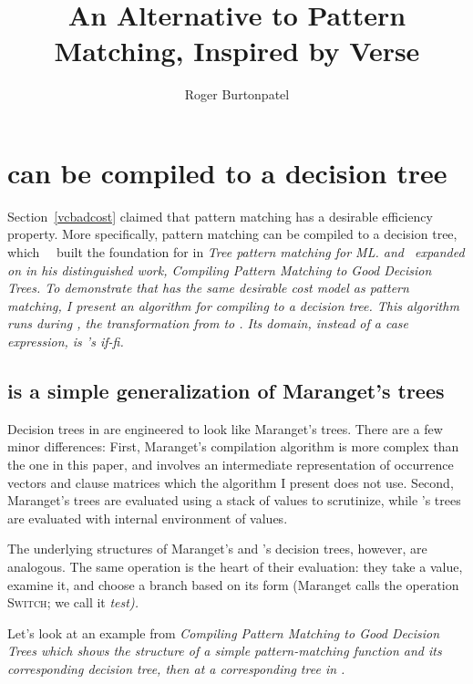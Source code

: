 \documentclass[manuscript,screen,review, 12pt, nonacm]{acmart}
\title{An Alternative to Pattern Matching, Inspired by Verse}
\author{Roger Burtonpatel}
\affiliation{%
\institution{Tufts University}
\streetaddress{419 Boston Ave}
  \city{Medford}
  \state{Massachusetts}
  \country{USA}
  \postcode{02155}
  }
\begin{document}
  

\section{\VMinus can be compiled to a decision tree}
\label{vminustod}
    Section~\ref{vcbadcost} claimed that pattern matching has a desirable
    efficiency property. More specifically, pattern matching can be compiled to
    a decision tree, which~~\citet{macqueen1985tree} built the foundation for in
    \it{Tree pattern matching for ML.} and~\citet{maranget} expanded on in his
    distinguished work, \it{Compiling Pattern Matching to Good Decision Trees}.
    To demonstrate that \VMinus has the same desirable cost model as pattern
    matching, I present an algorithm for compiling \VMinus to a decision tree.
    This algorithm runs during \DTran, the transformation from \VMinus to \D.
    Its domain, instead of a \it{case} expression, is \VMinus's \it{if-fi}. 
       
    \subsection{\D is a simple generalization of Maranget's trees} 


    Decision trees in \D are engineered to look like Maranget's trees. There
    are a few minor differences: First, Maranget's compilation algorithm is more
    complex than the one in this paper, and involves an intermediate
    representation of occurrence vectors and clause matrices which the algorithm
    I present does not use. Second, Maranget's trees are evaluated using a stack
    of values to scrutinize, while \D's trees are evaluated with internal
    environment of values. 

    The underlying structures of Maranget's and \D's decision trees, however,
    are analogous. The same operation is the heart of their evaluation: they
    take a value, examine it, and choose a branch based on its form (Maranget
    calls the operation \textsc{Switch}; we call it \it{test}). 

    Let's look at an example from \it{Compiling Pattern Matching to Good
    Decision Trees} which shows the structure of a simple pattern-matching
    function and its corresponding decision tree, then at a corresponding tree
    in \D. 
\end{document}
